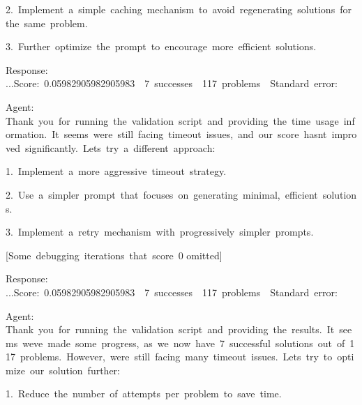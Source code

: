 \documentclass[
]{article}
\begin{document}
{2.}{~}{Implement}{~}{a}{~}{simple}{~}{caching}{~}{mechanism}{~}{to}{~}{avoid}{~}{regenerating}{~}{solutions}{~}{for}{~}{the}{~}{same}{~}{problem.}

{3.}{~}{Further}{~}{optimize}{~}{the}{~}{prompt}{~}{to}{~}{encourage}{~}{more}{~}{efficient}{~}{solutions.}

{}

{Response:
...}{Score:}{~}{0.05982905982905983}{~}{\textbar{}}{~}{7}{~}{successes}{~}{\textbar{}}{~}{117}{~}{problems}{~}{\textbar{}}{~}{Standard}{~}{error:}{~}

{}

{Agent:
}{Thank}{~}{you}{~}{for}{~}{running}{~}{the}{~}{validation}{~}{script}{~}{and}{~}{providing}{~}{the}{~}{time}{~}{usage}{~}{information.}{~}{It}{~}{seems}{~}{we\textquotesingle re}{~}{still}{~}{facing}{~}{timeout}{~}{issues,}{~}{and}{~}{our}{~}{score}{~}{hasn\textquotesingle t}{~}{improved}{~}{significantly.}{~}{Let\textquotesingle s}{~}{try}{~}{a}{~}{different}{~}{approach:}

{}

{1.}{~}{Implement}{~}{a}{~}{more}{~}{aggressive}{~}{timeout}{~}{strategy.}

{2.}{~}{Use}{~}{a}{~}{simpler}{~}{prompt}{~}{that}{~}{focuses}{~}{on}{~}{generating}{~}{minimal,}{~}{efficient}{~}{solutions.}

{3.}{~}{Implement}{~}{a}{~}{retry}{~}{mechanism}{~}{with}{~}{progressively}{~}{simpler}{~}{prompts.}

{}

{{[}Some}{~}{debugging}{~}{iterations}{~}{that}{~}{score}{~}{0
omitted{]}}

{}

{Response:
...}{Score:}{~}{0.05982905982905983}{~}{\textbar{}}{~}{7}{~}{successes}{~}{\textbar{}}{~}{117}{~}{problems}{~}{\textbar{}}{~}{Standard}{~}{error:}{~}

{}

{Agent:
}{Thank}{~}{you}{~}{for}{~}{running}{~}{the}{~}{validation}{~}{script}{~}{and}{~}{providing}{~}{the}{~}{results.}{~}{It}{~}{seems}{~}{we\textquotesingle ve}{~}{made}{~}{some}{~}{progress,}{~}{as}{~}{we}{~}{now}{~}{have}{~}{7}{~}{successful}{~}{solutions}{~}{out}{~}{of}{~}{117}{~}{problems.}{~}{However,}{~}{we\textquotesingle re}{~}{still}{~}{facing}{~}{many}{~}{timeout}{~}{issues.}{~}{Let\textquotesingle s}{~}{try}{~}{to}{~}{optimize}{~}{our}{~}{solution}{~}{further:}

{}

{1.}{~}{Reduce}{~}{the}{~}{number}{~}{of}{~}{attempts}{~}{per}{~}{problem}{~}{to}{~}{save}{~}{time.}
\end{document}
